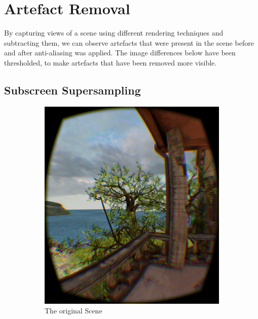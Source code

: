 \documentclass[12pt,a4paper,twoside,openright]{report}
\begin{document}
\clearpage
\section{Artefact Removal}\label{removeArtefacts}
By capturing views of a scene using different rendering techniques and subtracting them, we can observe artefacts that were present in the scene before and after anti-aliasing was applied. The image differences below have been thresholded, to make artefacts that have been removed more visible. 

\subsection{Subscreen Supersampling}

\begin{figure}[h]
\begin{subfigure}{0.5\textwidth}
\includegraphics[width=0.9\linewidth]{figs/tree_msaa.png}
\caption{The original Scene}
\label{fig:subim2}
\end{subfigure}
\begin{subfigure}{0.5\textwidth}

\end{subfigure}
\end{figure}
\end{document}
